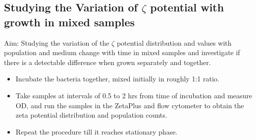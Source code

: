 \documentclass [a4paper,11pt]{article}
\begin{document}
\subsection{Studying the Variation of $\zeta$ potential with growth in mixed samples}
Aim: Studying the variation of the $\zeta$ potential distribution and values with population and medium change with time in mixed samples and investigate if there is a detectable difference when grown separately and together.
\begin{itemize}
	\item Incubate the bacteria together, mixed initially in roughly 1:1 ratio.
	\item Take samples at intervals of 0.5 to 2 hrs from time of incubation and measure OD, and run the samples in the ZetaPlus and flow cytometer to obtain the zeta potential distribution and population counts.
	\item Repeat the procedure till it reaches stationary phase.
\end{itemize}
\end{document}
